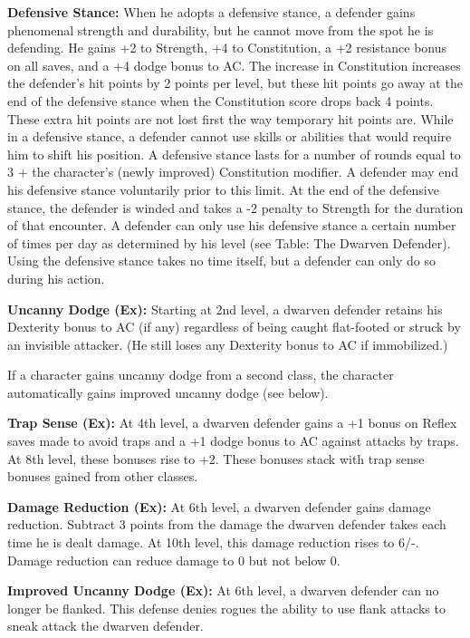 \documentclass{article}
\begin{document}
\textbf{Defensive Stance: } When he adopts a defensive stance, a defender gains 
phenomenal strength and durability, but he cannot move from the spot he is defending. 
He gains +2 to Strength, +4 to Constitution, a +2 resistance bonus on all saves, 
and a +4 dodge bonus to AC. The increase in Constitution increases the defender's 
hit points by 2 points per level, but these hit points go away at the end of the 
defensive stance when the Constitution score drops back 4 points. These extra hit 
points are not lost first the way temporary hit points are. While in a defensive 
stance, a defender cannot use skills or abilities that would require him to shift 
his position. A defensive stance lasts for a number of rounds equal to 3 + the 
character's (newly improved) Constitution modifier. A defender may end his defensive 
stance voluntarily prior to this limit. At the end of the defensive stance, the 
defender is winded and takes a -2 penalty to Strength for the duration of that 
encounter. A defender can only use his defensive stance a certain number of times 
per day as determined by his level (see Table: The Dwarven Defender). Using the 
defensive stance takes no time itself, but a defender can only do so during his 
action.

\textbf{Uncanny Dodge (Ex):} Starting at 2nd level, a dwarven defender retains 
his Dexterity bonus to AC (if any) regardless of being caught flat-footed or struck 
by an invisible attacker. (He still loses any Dexterity bonus to AC if immobilized.)

If a character gains uncanny dodge from a second class, the character automatically 
gains improved uncanny dodge (see below).

\textbf{Trap Sense (Ex):} At 4th level, a dwarven defender gains a +1 bonus on 
Reflex saves made to avoid traps and a +1 dodge bonus to AC against attacks by 
traps. At 8th level, these bonuses rise to +2. These bonuses stack with trap sense 
bonuses gained from other classes.

\textbf{Damage Reduction (Ex):} At 6th level, a dwarven defender gains damage reduction. 
Subtract 3 points from the damage the dwarven defender takes each time he is dealt 
damage. At 10th level, this damage reduction rises to 6/-. Damage reduction can 
reduce damage to 0 but not below 0.

\textbf{Improved Uncanny Dodge (Ex):} At 6th level, a dwarven defender can no longer 
be flanked. This defense denies rogues the ability to use flank attacks to sneak 
attack the dwarven defender.
\end{document}
